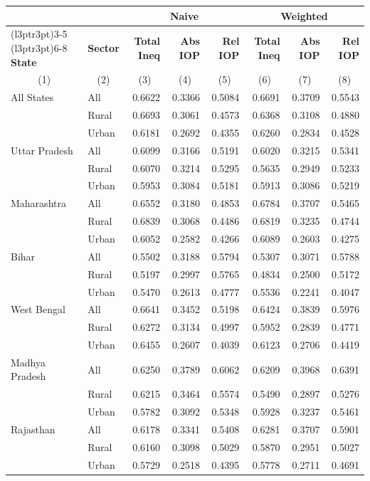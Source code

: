 
\begin{tabular}{llrrrrrr}
\toprule
\multicolumn{2}{c}{\textbf{ }} & \multicolumn{3}{c}{\textbf{Naive}} & \multicolumn{3}{c}{\textbf{Weighted}} \\
\cmidrule(l{3pt}r{3pt}){3-5} \cmidrule(l{3pt}r{3pt}){6-8}
\textbf{State} & \textbf{Sector} & \textbf{Total Ineq} & \textbf{Abs IOP} & \textbf{Rel IOP} & \textbf{Total Ineq} & \textbf{Abs IOP} & \textbf{Rel IOP}\\
\multicolumn{1}{c}{(1)} & \multicolumn{1}{c}{(2)} & \multicolumn{1}{c}{(3)} & \multicolumn{1}{c}{(4)} & \multicolumn{1}{c}{(5)} & \multicolumn{1}{c}{(6)} & \multicolumn{1}{c}{(7)} & \multicolumn{1}{c}{(8)} \\
\midrule
All States & All & 0.6622 & 0.3366 & 0.5084 & 0.6691 & 0.3709 & 0.5543\\
 & Rural & 0.6693 & 0.3061 & 0.4573 & 0.6368 & 0.3108 & 0.4880\\
 & Urban & 0.6181 & 0.2692 & 0.4355 & 0.6260 & 0.2834 & 0.4528\\
\addlinespace
Uttar Pradesh & All & 0.6099 & 0.3166 & 0.5191 & 0.6020 & 0.3215 & 0.5341\\
 & Rural & 0.6070 & 0.3214 & 0.5295 & 0.5635 & 0.2949 & 0.5233\\
 & Urban & 0.5953 & 0.3084 & 0.5181 & 0.5913 & 0.3086 & 0.5219\\
\addlinespace
Maharashtra & All & 0.6552 & 0.3180 & 0.4853 & 0.6784 & 0.3707 & 0.5465\\
 & Rural & 0.6839 & 0.3068 & 0.4486 & 0.6819 & 0.3235 & 0.4744\\
 & Urban & 0.6052 & 0.2582 & 0.4266 & 0.6089 & 0.2603 & 0.4275\\
\addlinespace
Bihar & All & 0.5502 & 0.3188 & 0.5794 & 0.5307 & 0.3071 & 0.5788\\
 & Rural & 0.5197 & 0.2997 & 0.5765 & 0.4834 & 0.2500 & 0.5172\\
 & Urban & 0.5470 & 0.2613 & 0.4777 & 0.5536 & 0.2241 & 0.4047\\
\addlinespace
West Bengal & All & 0.6641 & 0.3452 & 0.5198 & 0.6424 & 0.3839 & 0.5976\\
 & Rural & 0.6272 & 0.3134 & 0.4997 & 0.5952 & 0.2839 & 0.4771\\
 & Urban & 0.6455 & 0.2607 & 0.4039 & 0.6123 & 0.2706 & 0.4419\\
\addlinespace
Madhya Pradesh & All & 0.6250 & 0.3789 & 0.6062 & 0.6209 & 0.3968 & 0.6391\\
 & Rural & 0.6215 & 0.3464 & 0.5574 & 0.5490 & 0.2897 & 0.5276\\
 & Urban & 0.5782 & 0.3092 & 0.5348 & 0.5928 & 0.3237 & 0.5461\\
\addlinespace
Rajasthan & All & 0.6178 & 0.3341 & 0.5408 & 0.6281 & 0.3707 & 0.5901\\
 & Rural & 0.6160 & 0.3098 & 0.5029 & 0.5870 & 0.2951 & 0.5027\\
 & Urban & 0.5729 & 0.2518 & 0.4395 & 0.5778 & 0.2711 & 0.4691\\
\bottomrule
\end{tabular}
